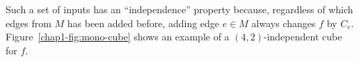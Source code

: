 
Such a set of inputs has an ``independence'' property because,
regardless of which edges from $M$ has been added before, adding edge $e \in M$
always changes $f$ by $C_e$. 
Figure~\ref{chap1-fig:mono-cube} shows an example of a $(4,2)$-independent cube for $f$. 

